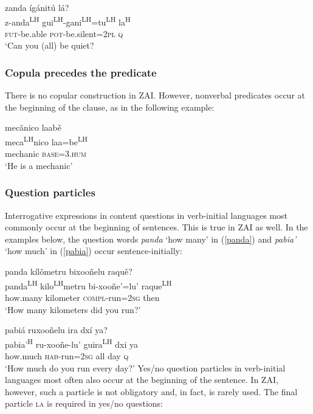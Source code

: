 \ea\label{auxmain}
zanda \'{i}g\'{a}nit\'{u} l\'{a}? \\
z-anda\textsuperscript{LH} gui\textsuperscript{LH}-gani\textsuperscript{LH}=tu\textsuperscript{LH} la\textsuperscript{H} \\
\textsc{fut}-be.able \textsc{pot}-be.silent=\textsc{2pl} \textsc{q} \\
\glt `Can you (all) be quiet?
\z


\subsubsection{Copula precedes the predicate} 

There is no copular construction in ZAI. However, nonverbal predicates occur at the beginning of the clause, as in the following example:

\ea
\glll mec\v{a}nico laab\v{e} \\
meca\textsuperscript{LH}nico laa=be\textsuperscript{LH} \\
mechanic \textsc{base}=\textsc{3.hum} \\
\glt `He is a mechanic'
\z



\subsubsection{Question particles}

Interrogative expressions in content questions in verb-initial languages most commonly occur at the beginning of sentences. This is true in ZAI as well. In the examples below, the question words \textit{panda} `how many' in (\ref{panda}) and \textit{pabia'} `how much' in (\ref{pabia}) occur sentence-initially:

\ea\label{panda}
panda k\'{i}l\v{o}metru bixoo\~{n}elu raqu\v{e}?  \\
panda\textsuperscript{LH} kilo\textsuperscript{LH}metru bi-xoo\~{n}e'=lu' raque\textsuperscript{LH} \\
how.many kilometer \textsc{compl}-run=\textsc{2sg} then \\
\glt `How many kilometers did you run?'
\z

\ea\label{pabia}
pabi\'{a} ruxoo\~{n}elu ira dx\'{i} ya? \\
pabia'\textsuperscript{H} ru-xoo\~{n}e-lu' guira\textsuperscript{LH} dxi ya \\
how.much \textsc{hab}-run=\textsc{2sg} all day \textsc{q} \\
\glt `How much do you run every day?'	
\z
Yes/no question particles in verb-initial languages most often also occur at the beginning of the sentence. In ZAI, however, such a particle is not obligatory and, in fact, is rarely used. The final particle \textsc{la} is required in yes/no questions:

